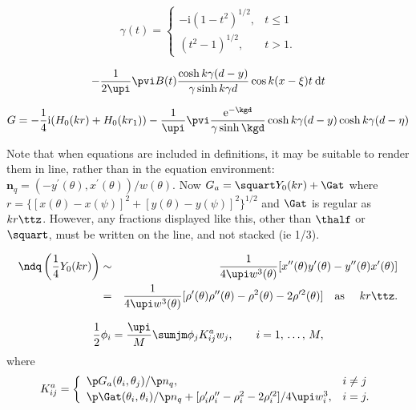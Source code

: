 \documentclass[lineno]{jfm}
\begin{document}
\begin{equation}
  \gamma(t) = \left\{
    \begin{array}{ll}
      -\mathrm{i}(1-t^2)^{1/2}, & t\le 1 \\[2pt]
      (t^2-1)^{1/2},         & t>1.
    \end{array} \right.
\end{equation}

\[
  -\frac{1}{2\upi}
   \pvi B(t)\frac{\cosh k\gamma(d-y)}{\gamma\sinh k\gamma d}
   \cos k(x-\xi)t\:\mathrm{d} t
\]

\begin{equation}
  G = -\frac{1}{4}\mathrm{i} (H_0(kr)+H_0(kr_1))
    - \frac{1}{\upi} \pvi\frac{\mathrm{e}^{-\kgd}}%
    {\gamma\sinh\kgd} \cosh k\gamma(d-y) \cosh k\gamma(d-\eta)
\end{equation}

Note that when equations are included in definitions, it may be suitable to render them in line, rather than in the equation environment: $\boldsymbol{n}_q=(-y^{\prime}(\theta),
x^{\prime}(\theta))/w(\theta)$.
Now $G_a=\squart Y_0(kr)+\Gat$ where
$r=\{[x(\theta)-x(\psi)]^2 + [y(\theta)-y(\psi)]^2\}^{1/2}$ and $\Gat$ is
regular as $kr\ttz$. However, any fractions displayed like this, other than $\thalf$ or $\squart$, must be written on the line, and not stacked (ie 1/3).

\begin{eqnarray}
  \ndq\left(\frac{1}{4} Y_0(kr)\right) & \sim &
    \frac{1}{4\upi w^3(\theta)}
    [x^{\prime\prime}(\theta)y^{\prime}(\theta)-
    y^{\prime\prime}(\theta)x^{\prime}(\theta)] \nonumber\\
  & = & \frac{1}{4\upi w^3(\theta)}
    [\rho^{\prime}(\theta)\rho^{\prime\prime}(\theta)
    - \rho^2(\theta)-2\rho^{\prime 2}(\theta)]
    \quad \mbox{as\ }\quad kr\ttz . \label{inteqpt}
\end{eqnarray}

\begin{equation}
  \frac{1}{2}\phi_i = \frac{\upi}{M} \sumjm\phi_j K_{ij}^a w_j,
  \qquad i=1,\,\ldots,\,M,
\end{equation}
where
\begin{equation}
  K_{ij}^a = \left\{
    \begin{array}{ll}
      \p G_a(\theta_i,\theta_j)/\p n_q, & i\neq j \\[2pt]
      \p\Gat(\theta_i,\theta_i)/\p n_q
      + [\rho_i^{\prime}\rho_i^{\prime\prime}-\rho_i^2-2\rho_i^{\prime 2}]
      / 4\upi w_i^3, & i=j.
  \end{array} \right.
\end{equation}
\end{document}
